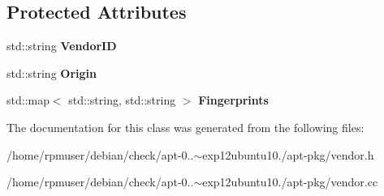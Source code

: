 \subsection*{\-Protected \-Attributes}
\begin{DoxyCompactItemize}
\item 
std\-::string {\bfseries \-Vendor\-I\-D}\label{classVendor_a96a898eabc1d57a772d7360f9d98fe5f}

\item 
std\-::string {\bfseries \-Origin}\label{classVendor_aa1c00e00ed8f483876e1b1b2ba904227}

\item 
std\-::map$<$ std\-::string, \*
std\-::string $>$ {\bfseries \-Fingerprints}\label{classVendor_a0a9b3216d9ebae259f316ea1c0323a40}

\end{DoxyCompactItemize}


\-The documentation for this class was generated from the following files\-:\begin{DoxyCompactItemize}
\item 
/home/rpmuser/debian/check/apt-\/0..$\sim$exp12ubuntu10./apt-\/pkg/vendor.\-h\item 
/home/rpmuser/debian/check/apt-\/0..$\sim$exp12ubuntu10./apt-\/pkg/vendor.\-cc\end{DoxyCompactItemize}

